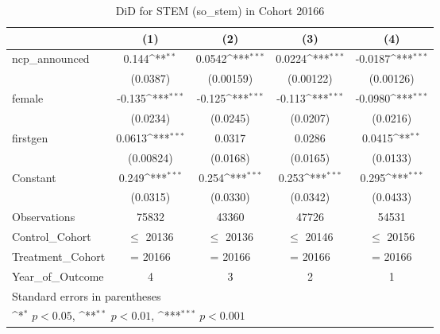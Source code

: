 \begin{table}[htbp]\centering
\def\sym#1{\ifmmode^{#1}\else\(^{#1}\)\fi}
\caption{DiD for STEM (so\_stem) in Cohort 20166}
\begin{tabular}{l*{4}{c}}
\toprule
                &\multicolumn{1}{c}{(1)}         &\multicolumn{1}{c}{(2)}         &\multicolumn{1}{c}{(3)}         &\multicolumn{1}{c}{(4)}         \\
\midrule
ncp\_announced   &    0.144\sym{**} &   0.0542\sym{***}&   0.0224\sym{***}&  -0.0187\sym{***}\\
                & (0.0387)         &(0.00159)         &(0.00122)         &(0.00126)         \\
\addlinespace
female          &   -0.135\sym{***}&   -0.125\sym{***}&   -0.113\sym{***}&  -0.0980\sym{***}\\
                & (0.0234)         & (0.0245)         & (0.0207)         & (0.0216)         \\
\addlinespace
firstgen        &   0.0613\sym{***}&   0.0317         &   0.0286         &   0.0415\sym{**} \\
                &(0.00824)         & (0.0168)         & (0.0165)         & (0.0133)         \\
\addlinespace
Constant        &    0.249\sym{***}&    0.254\sym{***}&    0.253\sym{***}&    0.295\sym{***}\\
                & (0.0315)         & (0.0330)         & (0.0342)         & (0.0433)         \\
\midrule
Observations    &    75832         &    43360         &    47726         &    54531         \\
Control\_Cohort  &$\le$ 20136         &$\le$ 20136         &$\le$ 20146         &$\le$ 20156         \\
Treatment\_Cohort&  = 20166         &  = 20166         &  = 20166         &  = 20166         \\
Year\_of\_Outcome &        4         &        3         &        2         &        1         \\
\bottomrule
\multicolumn{5}{l}{\footnotesize Standard errors in parentheses}\\
\multicolumn{5}{l}{\footnotesize \sym{*} \(p<0.05\), \sym{**} \(p<0.01\), \sym{***} \(p<0.001\)}\\
\end{tabular}
\end{table}
